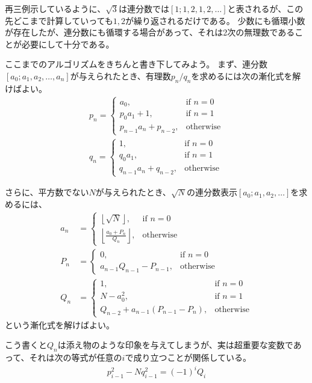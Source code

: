 再三例示しているように、$\sqrt{3}$は連分数では$[1;1,2,1,2,\ldots]$と表されるが、この先どこまで計算していっても$1,2$が繰り返されるだけである。
少数にも循環小数が存在したが、連分数にも循環する場合があって、それは2次の無理数であることが必要にして十分である。

ここまでのアルゴリズムをきちんと書き下してみよう。
まず、連分数$[a_0;a_1,a_2,\ldots,a_n]$が与えられたとき、有理数$p_n/q_n$を求めるには次の漸化式を解けばよい。
\begin{align*}
p_n = 
\begin{cases}
a_0, &\mbox{if } n = 0\\
p_0a_1 + 1, &\mbox{if } n = 1\\
p_{n-1}a_n + p_{n-2}, &\mbox{otherwise}
\end{cases}
\\
q_n = 
\begin{cases}
1, &\mbox{if } n = 0\\
q_0a_1, &\mbox{if } n = 1\\
q_{n-1}a_n + q_{n-2}, &\mbox{otherwise}
\end{cases}
\end{align*}

さらに、平方数でない$N$が与えられたとき、$\sqrt{N}$の連分数表示$[a_0;a_1,a_2,\ldots]$を求めるには、
\begin{align*}
a_n &= 
\begin{cases}
\left \lfloor \sqrt{N} \right \rfloor, &\mbox{if } n = 0\\
\left \lfloor \frac{a_0 + P_n}{Q_n} \right \rfloor, &\mbox{otherwise}
\end{cases}
\\
P_n &= 
\begin{cases}
0, &\mbox{if } n = 0\\
a_{n-1} Q_{n-1} - P_{n-1}, &\mbox{otherwise}
\end{cases}
\\
Q_n &= 
\begin{cases}
1, &\mbox{if } n = 0\\
N - a_0^2, &\mbox{if } n = 1\\
Q_{n-2} + a_{n-1}(P_{n-1} - P_n), &\mbox{otherwise}
\end{cases}
\end{align*}
という漸化式を解けばよい。


こう書くと$Q_n$は添え物のような印象を与えてしまうが、実は超重要な変数であって、それは次の等式が任意の$i$で成り立つことが関係している。
\begin{align*}
p_{i-1}^2 - N q_{i-1}^2 = (-1)^i Q_i
\end{align*}

